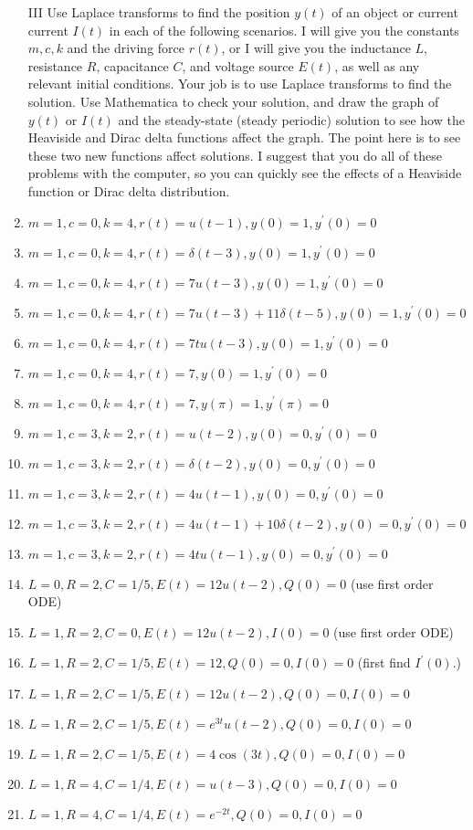 \begin{enumerate}
\item[III] Use Laplace transforms to find the position $y(t)$ of an object or current current $I(t)$ in each of the following scenarios. I will give you the constants $m,c,k$ and the driving force $r(t)$, or I will give you the inductance $L$, resistance $R$, capacitance $C$, and voltage source $E(t)$, as well as any relevant initial conditions.  Your job is to use Laplace transforms to find the solution. Use Mathematica to check your solution, and draw the graph of $y(t)$ or $I(t)$ and the steady-state (steady periodic) solution to see how the Heaviside and Dirac delta functions affect the graph. The point here is to see these two new functions affect solutions. I suggest that you do all of these problems with the computer, so you can quickly see the effects of a Heaviside function or Dirac delta distribution.
\item $m = 1, c = 0, k=4, r(t)=u(t-1), y(0)=1,y^\prime(0)=0$
\item $m = 1, c = 0, k=4, r(t)=\delta(t-3), y(0)=1,y^\prime(0)=0$
\item $m = 1, c = 0, k=4, r(t)=7u(t-3), y(0)=1,y^\prime(0)=0$
\item $m = 1, c = 0, k=4, r(t)=7u(t-3)+11\delta(t-5), y(0)=1,y^\prime(0)=0$
\item $m = 1, c = 0, k=4, r(t)=7t u(t-3), y(0)=1,y^\prime(0)=0$
\item $m = 1, c = 0, k=4, r(t)=7, y(0)=1,y^\prime(0)=0$
\item $m = 1, c = 0, k=4, r(t)=7, y(\pi)=1,y^\prime(\pi)=0$

\item $m = 1, c = 3, k=2, r(t)=u(t-2), y(0)=0,y^\prime(0)=0$
\item $m = 1, c = 3, k=2, r(t)=\delta(t-2), y(0)=0,y^\prime(0)=0$
\item $m = 1, c = 3, k=2, r(t)=4u(t-1), y(0)=0,y^\prime(0)=0$
\item $m = 1, c = 3, k=2, r(t)=4u(t-1)+10\delta(t-2), y(0)=0,y^\prime(0)=0$
\item $m = 1, c = 3, k=2, r(t)=4t u(t-1), y(0)=0,y^\prime(0)=0$

\item $L = 0, R = 2, C=1/5, E(t)=12 u(t-2), Q(0)=0$ (use first order ODE)
\item $L = 1, R = 2, C=0, E(t)=12 u(t-2), I(0)=0$ (use first order ODE)
\item $L = 1, R = 2, C=1/5, E(t)=12, Q(0)=0,I(0)=0$ (first find $I^\prime(0)$.)
\item $L = 1, R = 2, C=1/5, E(t)=12 u(t-2), Q(0)=0,I(0)=0$
\item $L = 1, R = 2, C=1/5, E(t)=e^{3t} u(t-2), Q(0)=0,I(0)=0$
\item $L = 1, R = 2, C=1/5, E(t)=4\cos (3t), Q(0)=0,I(0)=0$
\item $L = 1, R = 4, C=1/4, E(t)=u(t-3), Q(0)=0,I(0)=0$
\item $L = 1, R = 4, C=1/4, E(t)=e^{-2t}, Q(0)=0,I(0)=0$



\end{enumerate}
